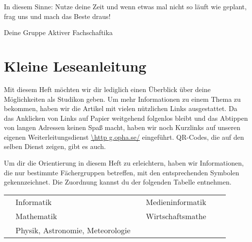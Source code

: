 In diesem Sinne: Nutze deine Zeit und wenn etwas mal nicht so läuft wie geplant, frag uns und mach das Beste draus!

Deine Gruppe Aktiver Fachschaftika

\chapter{Kleine Leseanleitung}

Mit diesem Heft möchten wir dir lediglich einen Überblick über deine Möglichkeiten als Studikon geben. Um mehr Informationen zu einem Thema zu bekommen, haben wir die Artikel mit vielen nützlichen Links ausgestattet. Da das Anklicken von Links auf Papier weitgehend folgenlos bleibt und das Abtippen von langen Adressen keinen Spaß macht, haben wir noch Kurzlinks auf unseren eigenen Weiterleitungsdienst \mbox{\url{\http g.opha.se/}} eingeführt. QR-Codes, die auf den selben Dienst zeigen, gibt es auch.

Um dir die Orientierung in diesem Heft zu erleichtern, haben wir Informationen, die nur bestimmte Fächergruppen betreffen, mit den entsprechenden Symbolen gekennzeichnet. Die Zuordnung kannst du der folgenden Tabelle entnehmen.

\begin{table*}[h]
	\centering
	\begin{tabular}{ l l l l l l}
		\subjectI & Informatik  & \subjectMI & Medieninformatik \\[1.5mm]
		\subjectM & Mathematik  & \subjectW  & Wirtschaftsmathe \\[1.5mm]
		\subjectP & Physik, Astronomie, Meteorologie
	\end{tabular}
\end{table*}
